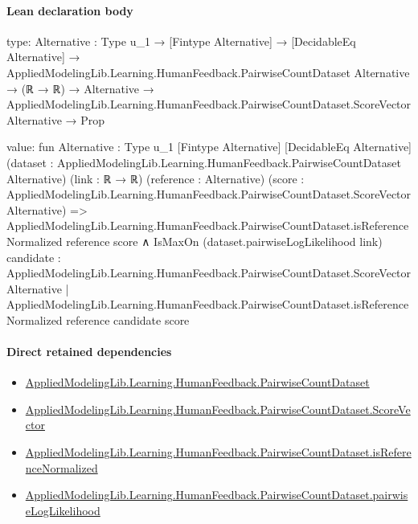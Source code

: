 \documentclass[10pt]{article}
\begin{document}
\paragraph{Lean declaration body}
\begin{ReviewVerbatim}
type:
{Alternative : Type u_1} →
  [Fintype Alternative] →
    [DecidableEq Alternative] →
      AppliedModelingLib.Learning.HumanFeedback.PairwiseCountDataset Alternative →
        (ℝ → ℝ) →
          Alternative → AppliedModelingLib.Learning.HumanFeedback.PairwiseCountDataset.ScoreVector Alternative → Prop

value:
fun {Alternative : Type u_1} [Fintype Alternative] [DecidableEq Alternative]
    (dataset : AppliedModelingLib.Learning.HumanFeedback.PairwiseCountDataset Alternative) (link : ℝ → ℝ)
    (reference : Alternative)
    (score : AppliedModelingLib.Learning.HumanFeedback.PairwiseCountDataset.ScoreVector Alternative) =>
  AppliedModelingLib.Learning.HumanFeedback.PairwiseCountDataset.isReferenceNormalized reference score ∧
    IsMaxOn (dataset.pairwiseLogLikelihood link)
      {candidate : AppliedModelingLib.Learning.HumanFeedback.PairwiseCountDataset.ScoreVector Alternative |
        AppliedModelingLib.Learning.HumanFeedback.PairwiseCountDataset.isReferenceNormalized reference candidate}
      score
\end{ReviewVerbatim}

\paragraph{Direct retained dependencies}
\begin{itemize}\raggedright
\item \hyperlink{governing-declaration-2ba23f394a8d08a2}{Applied\allowbreak{}Modeling\allowbreak{}Lib.\allowbreak{}Learning.\allowbreak{}Human\allowbreak{}Feedback.\allowbreak{}Pairwise\allowbreak{}Count\allowbreak{}Dataset}
\item \hyperlink{governing-declaration-87eda978eb1b0c9d}{Applied\allowbreak{}Modeling\allowbreak{}Lib.\allowbreak{}Learning.\allowbreak{}Human\allowbreak{}Feedback.\allowbreak{}Pairwise\allowbreak{}Count\allowbreak{}Dataset.\allowbreak{}Score\allowbreak{}Vector}
\item \hyperlink{governing-declaration-183c779b24cebcca}{Applied\allowbreak{}Modeling\allowbreak{}Lib.\allowbreak{}Learning.\allowbreak{}Human\allowbreak{}Feedback.\allowbreak{}Pairwise\allowbreak{}Count\allowbreak{}Dataset.\allowbreak{}is\allowbreak{}Reference\allowbreak{}Normalized}
\item \hyperlink{governing-declaration-10adb9e7c1ff9f4c}{Applied\allowbreak{}Modeling\allowbreak{}Lib.\allowbreak{}Learning.\allowbreak{}Human\allowbreak{}Feedback.\allowbreak{}Pairwise\allowbreak{}Count\allowbreak{}Dataset.\allowbreak{}pairwise\allowbreak{}Log\allowbreak{}Likelihood}
\end{itemize}
\hypertarget{governing-declaration-ed6af38b0210f5ec}{}
\end{document}
